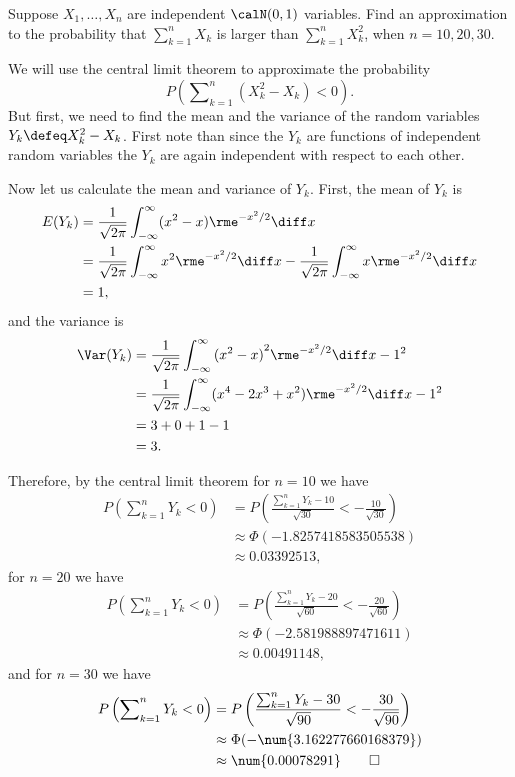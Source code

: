 \begin{problem}[Handout 14, \# 7]
  Suppose \(X_1,\dotsc,X_n\) are independent \(\calN(0,1)\) variables. Find
  an approximation to the probability that \(\sum_{k=1}^n X_k\) is larger
  than \(\sum_{k=1}^n X_k^2\), when \(n=10,20,30\).
\end{problem}
\begin{solution}
  We will use the central limit theorem to approximate the probability
  \[
    P\left(\sum\nolimits_{k=1}^n (X_k^2-X_k)<0\right).
  \]
  But first, we need to find the mean and the variance of the random
  variables \(Y_k\defeq X_k^2-X_k\). First note than since the \(Y_k\) are
  functions of independent random variables the \(Y_k\) are again
  independent with respect to each other.

  Now let us calculate the mean and variance of \(Y_k\). First, the mean of
  \(Y_k\) is
  \begin{align*}
    E(Y_k)
    &=\frac{1}{\sqrt{2\pi}}\int_{-\infty}^\infty (x^2-x)\rme^{-x^2/2}\diff
      x\\
    &=\frac{1}{\sqrt{2\pi}}\int_{-\infty}^\infty x^2\rme^{-x^2/2}\diff
      x
      -\frac{1}{\sqrt{2\pi}}\int_{-\infty}^\infty x\rme^{-x^2/2}\diff
      x\\
    &=1,
  \end{align*}
  and the variance is
  \begin{align*}
    \Var(Y_k)
    &=\frac{1}{\sqrt{2\pi}}\int_{-\infty}^\infty {(x^2-x)}^2
      \rme^{-x^2/2}\diff x-1^2\\
    &=\frac{1}{\sqrt{2\pi}}\int_{-\infty}^\infty (x^4-2x^3+x^2)
      \rme^{-x^2/2}\diff x-1^2\\
    &=3+0+1-1\\
    &=3.
  \end{align*}

  Therefore, by the central limit theorem for \(n=10\) we have
  \begin{align*}
    P\left(\sum\nolimits_{k=1}^nY_k<0\right)
    &=P\left(\frac{\sum\nolimits_{k=1}^nY_k-10}
      {\sqrt{30}}<-\frac{10}{\sqrt{30}}\right)\\
    &\approx\Phi(-\num{1.8257418583505538})\\
    &\approx\num{0.03392513},
  \end{align*}
  for \(n=20\) we have
  \begin{align*}
    P\left(\sum\nolimits_{k=1}^nY_k<0\right)
    &=P\left(\frac{\sum\nolimits_{k=1}^nY_k-20}
      {\sqrt{60}}<-\frac{20}{\sqrt{60}}\right)\\
    &\approx\Phi(-\num{2.581988897471611})\\
    &\approx\num{0.00491148},
  \end{align*}
  and for \(n=30\) we have
  \begin{align*}
    P\left(\sum\nolimits_{k=1}^nY_k<0\right)
    &=P\left(\frac{\sum\nolimits_{k=1}^nY_k-30}
      {\sqrt{90}}<-\frac{30}{\sqrt{90}}\right)\\
    &\approx\Phi(-\num{3.162277660168379})\\
    &\approx\num{0.00078291}\qedhere
  \end{align*}
\end{solution}
\newpage

